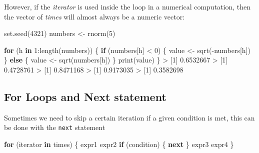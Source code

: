 \documentclass[
]{book}
\newenvironment{Shaded}{\begin{snugshade}}{\end{snugshade}}
\newcommand{\ControlFlowTok}[1]{\textcolor[rgb]{0.13,0.29,0.53}{\textbf{#1}}}
\newcommand{\DecValTok}[1]{\textcolor[rgb]{0.00,0.00,0.81}{#1}}
\newcommand{\FloatTok}[1]{\textcolor[rgb]{0.00,0.00,0.81}{#1}}
\newcommand{\FunctionTok}[1]{\textcolor[rgb]{0.00,0.00,0.00}{#1}}
\newcommand{\NormalTok}[1]{#1}
\newcommand{\OtherTok}[1]{\textcolor[rgb]{0.56,0.35,0.01}{#1}}
\newcommand{\SpecialCharTok}[1]{\textcolor[rgb]{0.00,0.00,0.00}{#1}}
\begin{document}
However, if the \emph{iterator} is used inside the loop in a numerical computation,
then the vector of \emph{times} will almost always be a numeric vector:

\begin{Shaded}
\begin{Highlighting}[]
\FunctionTok{set.seed}\NormalTok{(}\DecValTok{4321}\NormalTok{)}
\NormalTok{numbers }\OtherTok{\textless{}{-}} \FunctionTok{rnorm}\NormalTok{(}\DecValTok{5}\NormalTok{)}

\ControlFlowTok{for}\NormalTok{ (h }\ControlFlowTok{in} \DecValTok{1}\SpecialCharTok{:}\FunctionTok{length}\NormalTok{(numbers)) \{}
  \ControlFlowTok{if}\NormalTok{ (numbers[h] }\SpecialCharTok{\textless{}} \DecValTok{0}\NormalTok{) \{}
\NormalTok{    value }\OtherTok{\textless{}{-}} \FunctionTok{sqrt}\NormalTok{(}\SpecialCharTok{{-}}\NormalTok{numbers[h])}
\NormalTok{  \} }\ControlFlowTok{else}\NormalTok{ \{}
\NormalTok{    value }\OtherTok{\textless{}{-}} \FunctionTok{sqrt}\NormalTok{(numbers[h])}
\NormalTok{  \}}
  \FunctionTok{print}\NormalTok{(value)}
\NormalTok{\}}
\SpecialCharTok{\textgreater{}}\NormalTok{ [}\DecValTok{1}\NormalTok{] }\FloatTok{0.6532667}
\SpecialCharTok{\textgreater{}}\NormalTok{ [}\DecValTok{1}\NormalTok{] }\FloatTok{0.4728761}
\SpecialCharTok{\textgreater{}}\NormalTok{ [}\DecValTok{1}\NormalTok{] }\FloatTok{0.8471168}
\SpecialCharTok{\textgreater{}}\NormalTok{ [}\DecValTok{1}\NormalTok{] }\FloatTok{0.9173035}
\SpecialCharTok{\textgreater{}}\NormalTok{ [}\DecValTok{1}\NormalTok{] }\FloatTok{0.3582698}
\end{Highlighting}
\end{Shaded}

\hypertarget{for-loops-and-next-statement}{%
\subsection{For Loops and Next statement}\label{for-loops-and-next-statement}}

Sometimes we need to skip a certain iteration if a given condition is met, this
can be done with the \texttt{next} statement

\begin{Shaded}
\begin{Highlighting}[]
\ControlFlowTok{for}\NormalTok{ (iterator }\ControlFlowTok{in}\NormalTok{ times) \{ }
\NormalTok{  expr1}
\NormalTok{  expr2}
  \ControlFlowTok{if}\NormalTok{ (condition) \{}
    \ControlFlowTok{next}
\NormalTok{  \}}
\NormalTok{  expr3}
\NormalTok{  expr4}
\NormalTok{\}}
\end{Highlighting}
\end{Shaded}
\end{document}
